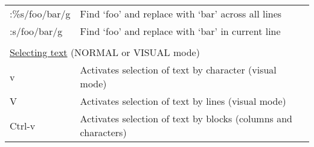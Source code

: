 \documentclass[11pt,a4paper,oneside]{article}
\begin{document}
\begin{table}
\begin{tabular}{p{5.5cm} l}
:\%s/foo/bar/g & Find `foo' and replace with `bar' across all lines \\
:s/foo/bar/g & Find `foo' and replace with `bar' in current line \\
 & \\[-1.5ex]
\multicolumn{2}{l}{\underline{Selecting text} (NORMAL or VISUAL mode)} \\
v & Activates selection of text by character (visual mode) \\
V & Activates selection of text by lines (visual mode) \\
Ctrl-v & Activates selection of text by blocks (columns and characters) \\

\end{tabular}

\end{table}
\end{document}

